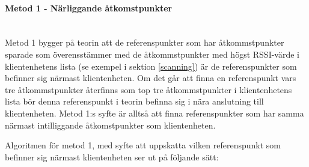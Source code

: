 \documentclass[swedish, a4paper,12pt]{article}
\begin{document}
\paragraph{Metod 1 - Närliggande åtkomstpunkter}
\leavevmode\\
Metod 1 bygger på teorin att de referenspunkter som har åtkommstpunkter sparade som överensstämmer med de åtkommstpunkter med högst RSSI-värde i klientenhetens lista (se exempel i sektion \ref{scanning}) är de referenspunkter som befinner sig närmast klientenheten. Om det går att finna en referenspunkt vars tre åtkommstpunkter återfinns som top tre åtkommstpunkter i klientenhetens lista bör denna referenspunkt i teorin befinna sig i nära anslutning till klientenheten.
Metod 1:s syfte är alltså att finna referenspunkter som har samma närmast intilliggande åtkomstpunkter som klientenheten.

Algoritmen för metod 1, med syfte att uppskatta vilken referenspunkt som befinner sig närmast klientenheten ser ut på följande sätt:
\end{document}

